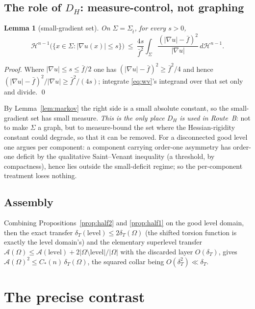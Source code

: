 \documentclass[11pt]{amsart}
\newtheorem{lemma}[theorem]{Lemma}
\theoremstyle{definition}
\theoremstyle{remark}
\newcommand{\Om}{\Omega}
\newcommand{\dT}{\delta_T}
\newcommand{\Asym}{\mathcal A}
\newcommand{\Sg}{\Sigma}
\newcommand{\fbar}{\bar f}
\newcommand{\Hn}{\mathcal H^{n-1}}
\begin{document}
\subsection{The role of $D_H$: measure-control, not graphing}
\begin{lemma}[small-gradient set]\label{lem:sg}
On $\Sg=\Sg_{\hat t}$, for every $s>0$,
\[
  \Hn\bigl(\{x\in\Sg:|\nabla u(x)|\le s\}\bigr)
  \ \le\ \frac{4s}{\fbar^2}\int_{\Sg}\frac{(|\nabla u|-\fbar)^2}{|\nabla u|}\,d\Hn .
\]
\end{lemma}
\begin{proof}
Where $|\nabla u|\le s\le\fbar/2$ one has
$(|\nabla u|-\fbar)^2\ge\fbar^2/4$ and hence
$(|\nabla u|-\fbar)^2/|\nabla u|\ge\fbar^2/(4s)$; integrate
\eqref{eq:wv}'s integrand over that set only and divide. \qed
\end{proof}
By Lemma~\ref{lem:markov} the right side is a small absolute constant,
so the small-gradient set has small measure. \emph{This is the only
place $D_H$ is used in Route~B}: not to make $\Sg$ a graph, but to
measure-bound the set where the Hessian-rigidity constant could
degrade, so that it can be removed. For a disconnected good level one
argues per component: a component carrying order-one asymmetry has
order-one deficit by the qualitative Saint--Venant inequality (a
threshold, by compactness), hence lies outside the small-deficit
regime; so the per-component treatment loses nothing.

\subsection{Assembly}
Combining Propositions~\ref{prop:half2} and \ref{prop:half1} on the
good level domain, then the exact transfer $\dT(\text{level})\le
2\dT(\Om)$ (the shifted torsion function is exactly the level
domain's) and the elementary superlevel transfer
$\Asym(\Om)\le\Asym(\text{level})+2|\Om\setminus\text{level}|/|\Om|$
with the discarded layer $O(\dT)$, gives
$\Asym(\Om)^2\le C_*(n)\,\dT(\Om)$, the squared collar being
$O(\dT^2)\ll\dT$.

\section{The precise contrast}
\end{document}
